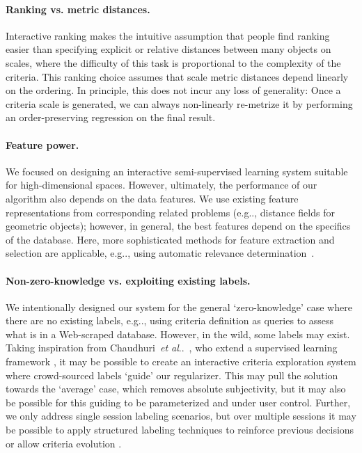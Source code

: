 \documentclass{article}
\makeatletter
\DeclareRobustCommand\onedot{\futurelet\@let@token\@onedot}
\def\@onedot{\ifx\@let@token.\else.\null\fi\xspace}
\def\eg{{e.g}\onedot} \def\Eg{{E.g}\onedot}
\def\etal{\emph{et al}\onedot}
\makeatother
\begin{document}
\paragraph{Ranking vs. metric distances.}
Interactive ranking makes the intuitive assumption that people find ranking easier than specifying explicit or relative distances between many objects on scales, where the difficulty of this task is proportional to the complexity of the criteria. This ranking choice assumes that scale metric distances depend linearly on the ordering. In principle, this does not incur any loss of generality: Once a criteria scale is generated, we can always non-linearly re-metrize it by performing an order-preserving regression on the final result.

\paragraph{Feature power.}
We focused on designing an interactive semi-supervised learning system suitable for high-dimensional spaces. However, ultimately, the performance of our algorithm also depends on the data features. We use existing feature representations from corresponding related problems (\eg, distance fields for geometric objects); however, in general, the best features depend on the specifics of the database. Here, more sophisticated methods for feature extraction and selection are applicable, \eg, using automatic relevance determination~\cite{RasWill06}.

\paragraph{Non-zero-knowledge vs. exploiting existing labels.}
We intentionally designed our system for the general `zero-knowledge' case where there are no existing labels, \eg, using criteria definition as queries to assess what is in a Web-scraped database. However, in the wild, some labels may exist. Taking inspiration from Chaudhuri~\etal~\cite{ChaKalGig13}, who extend a supervised learning framework \cite{ParGra11}, it may be possible to create an interactive criteria exploration system where crowd-sourced labels `guide' our regularizer. This may pull the solution towards the `average' case, which removes absolute subjectivity, but it may also be possible for this guiding to be parameterized and under user control. Further, we only address single session labeling scenarios, but over multiple sessions it may be possible to apply structured labeling techniques to reinforce previous decisions or allow criteria evolution \cite{KulAmeCar14}.
\end{document}

